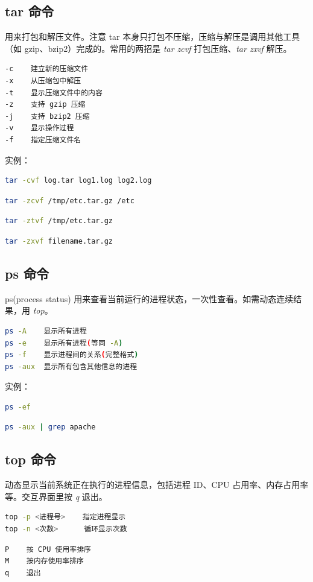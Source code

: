 \documentclass[12pt,a4paper]{ctexbook}
\begin{document}
\subsection{tar 命令}
用来打包和解压文件。注意 tar 本身只打包不压缩，压缩与解压是调用其他工具（如 gzip、bzip2）完成的。常用的两招是 \textit{tar zcvf} 打包压缩、\textit{tar zxvf} 解压。
\begin{lstlisting}[language=bash,title={tar 常用参数}]
-c    建立新的压缩文件
-x    从压缩包中解压
-t    显示压缩文件中的内容
-z    支持 gzip 压缩
-j    支持 bzip2 压缩
-v    显示操作过程
-f    指定压缩文件名
\end{lstlisting}
实例：
\begin{lstlisting}[language=bash,title={将文件全部打包成 tar 包}]
    tar -cvf log.tar log1.log log2.log
\end{lstlisting}
\begin{lstlisting}[language=bash,title={将 /etc 下所有文件和目录打包并用 gz 压缩}]
    tar -zcvf /tmp/etc.tar.gz /etc
\end{lstlisting}
\begin{lstlisting}[language=bash,title={查看刚打包的文件内容(必须加 z, 因为用 gzip 压缩)}]
    tar -ztvf /tmp/etc.tar.gz
\end{lstlisting}
\begin{lstlisting}[language=bash,title={解压}]
    tar -zxvf filename.tar.gz
\end{lstlisting}

\subsection{ps 命令}
ps(process status) 用来查看当前运行的进程状态，一次性查看。如需动态连续结果，用 \textit{top}。
\begin{lstlisting}[language=bash,title={ps 常用参数}]
ps -A    显示所有进程
ps -e    显示所有进程(等同 -A)
ps -f    显示进程间的关系(完整格式)
ps -aux  显示所有包含其他信息的进程
\end{lstlisting}
实例：
\begin{lstlisting}[language=bash,title={显示当前所有进程环境变量及进程间关系}]
    ps -ef
\end{lstlisting}
\begin{lstlisting}[language=bash,title={与 grep 联用查找某进程}]
    ps -aux | grep apache
\end{lstlisting}

\subsection{top 命令}
动态显示当前系统正在执行的进程信息，包括进程 ID、CPU 占用率、内存占用率等。交互界面里按 \textit{q} 退出。
\begin{lstlisting}[language=bash,title={top 常用参数}]
top -p <进程号>    指定进程显示
top -n <次数>      循环显示次数
\end{lstlisting}
\begin{lstlisting}[language=bash,title={top 交互命令}]
P    按 CPU 使用率排序
M    按内存使用率排序
q    退出
\end{lstlisting}
\end{document}
